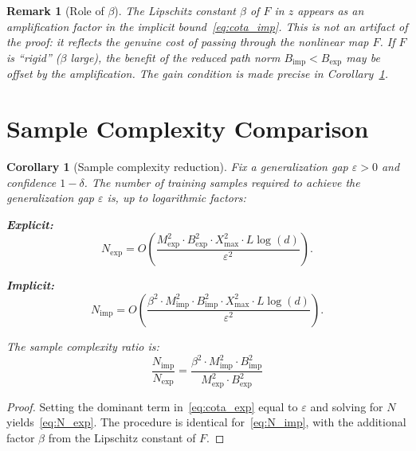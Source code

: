 \documentclass[12pt]{article}
\newtheorem{corollary}[theorem]{Corollary}
\newtheorem{remark}{Remark}
\begin{document}
\begin{remark}[Role of $\beta$]
\label{rem:beta}
The Lipschitz constant $\beta$ of $F$ in $z$ appears as an
amplification factor in the implicit bound~\eqref{eq:cota_imp}.
This is not an artifact of the proof: it reflects the genuine cost
of passing through the nonlinear map $F$.
If $F$ is ``rigid'' ($\beta$ large), the benefit of the reduced
path norm $B_{\mathrm{imp}} < B_{\mathrm{exp}}$ may be offset by
the amplification.
The gain condition is made precise in Corollary~\ref{cor:datos}.
\end{remark}

\section{Sample Complexity Comparison}
\label{sec:sample}

\begin{corollary}[Sample complexity reduction]
\label{cor:datos}
Fix a generalization gap $\varepsilon > 0$ and confidence
$1 - \delta$.
The number of training samples required to achieve the generalization
gap $\varepsilon$ is, up to logarithmic factors:

\textbf{Explicit:}
\begin{equation}
  N_{\mathrm{exp}} = O\!\left(
    \frac{M_{\mathrm{exp}}^2 \cdot B_{\mathrm{exp}}^2 \cdot
      X_{\max}^2 \cdot L\log(d)}{\varepsilon^2}
  \right).
  \label{eq:N_exp}
\end{equation}

\textbf{Implicit:}
\begin{equation}
  N_{\mathrm{imp}} = O\!\left(
    \frac{\beta^2 \cdot M_{\mathrm{imp}}^2 \cdot B_{\mathrm{imp}}^2
      \cdot X_{\max}^2 \cdot L\log(d)}{\varepsilon^2}
  \right).
  \label{eq:N_imp}
\end{equation}

The sample complexity ratio is:
\begin{equation}
  \boxed{
    \frac{N_{\mathrm{imp}}}{N_{\mathrm{exp}}}
    = \frac{\beta^2 \cdot M_{\mathrm{imp}}^2 \cdot
      B_{\mathrm{imp}}^2}
    {M_{\mathrm{exp}}^2 \cdot B_{\mathrm{exp}}^2}
  }
  \label{eq:ratio}
\end{equation}
\end{corollary}

\begin{proof}
Setting the dominant term in~\eqref{eq:cota_exp} equal to
$\varepsilon$ and solving for $N$ yields~\eqref{eq:N_exp}.
The procedure is identical for~\eqref{eq:N_imp}, with the additional
factor $\beta$ from the Lipschitz constant of $F$.
\end{proof}
\end{document}
